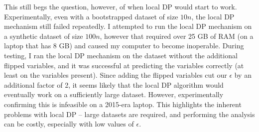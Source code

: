 \documentclass[12pt]{article}
\begin{document}
\bigskip

This still begs the question, however, of when local DP would start to work. Experimentally, even with a bootstrapped dataset of size $10n$, the local DP mechanism still failed repeatedly. I attempted to run the local DP mechanism on a synthetic dataset of size $100n$, however that required over 25 GB of RAM (on a laptop that has 8 GB) and caused my computer to become inoperable. During testing, I ran the local DP mechanism on the dataset without the additional flipped variables, and it was successful at predicting the variables correctly (at least on the variables present). Since adding the flipped variables cut our $\epsilon$ by an additional factor of 2, it seems likely that the local DP algorithm would eventually work on a sufficiently large dataset. However, experimentally confirming this is infeasible on a 2015-era laptop. This highlights the inherent problems with local DP -- large datasets are required, and performing the analysis can be costly, especially with low values of $\epsilon$.


\newpage
\end{document}
